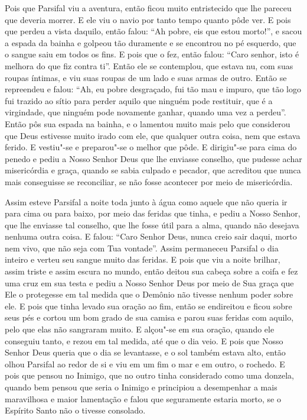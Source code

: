 Pois que Parsifal viu a aventura, então ficou muito entristecido que lhe
pareceu que deveria morrer. E ele viu o navio por tanto tempo quanto pôde ver.
E pois que perdeu a vista daquilo, então falou: “Ah pobre, eis que estou
morto!”, e sacou a espada da bainha e golpeou tão duramente e se encontrou no
pé esquerdo, que o sangue saiu em todos os fins. E pois que o fez, então falou:
“Caro senhor, isto é melhora do que fiz contra ti”. Então ele se contemplou,
que estava nu, com suas roupas íntimas, e viu suas roupas de um lado e suas
armas de outro. Então se repreendeu e falou: “Ah, eu pobre desgraçado, fui tão
mau e impuro, que tão logo fui trazido ao sítio para perder aquilo que ninguém
pode restituir, que é a virgindade, que ninguém pode novamente ganhar, quando
uma vez a perdeu”.  Então pôs sua espada na bainha, e o lamentou muito
mais pelo que considerou que Deus estivesse muito irado com ele, que qualquer
outra coisa, nem que estava ferido. E vestiu"-se e preparou"-se o melhor que
pôde. E dirigiu"-se para cima do penedo e pediu a Nosso Senhor Deus que lhe
enviasse conselho, que pudesse achar misericórdia e graça, quando se sabia
culpado e pecador, que acreditou que nunca mais conseguisse se reconciliar, se
não fosse acontecer por meio de misericórdia. 

Assim esteve Parsifal a noite toda junto à água como aquele que não queria
ir para cima ou para baixo, por meio das feridas que tinha, e pediu a Nosso
Senhor, que lhe enviasse tal conselho, que lhe fosse útil para a alma, quando
não desejava nenhuma outra coisa. E falou: “Caro Senhor Deus, nunca creio sair
daqui, morto nem vivo, que não seja com Tua vontade”.  Assim permaneceu
Parsifal o dia inteiro e verteu seu sangue muito das feridas. E pois que viu a
noite brilhar, assim triste e assim escura no mundo, então deitou sua cabeça
sobre a coifa e fez uma cruz em sua testa e pediu a Nosso Senhor Deus por meio
de Sua graça que Ele o protegesse em tal medida que o Demônio não tivesse
nenhum poder sobre ele. E pois que tinha levado sua oração ao fim, então se
endireitou e ficou sobre seus pés e cortou um bom grado de sua camisa e parou
suas feridas com aquilo,  pelo que elas não sangraram muito. E alçou"-se em sua
oração, quando ele conseguiu tanto, e rezou em tal medida, até que o dia veio.
E pois que Nosso Senhor Deus queria que o dia se levantasse, e o sol também
estava alto, então olhou Parsifal ao redor de si e viu em um fim o mar e em
outro, o rochedo. E pois que pensou no Inimigo, que no outro tinha considerado
como uma donzela, quando bem pensou que seria o Inimigo e principiou a
desempenhar a mais maravilhosa e maior lamentação e falou que seguramente
estaria morto, se o Espírito Santo não o tivesse consolado.

